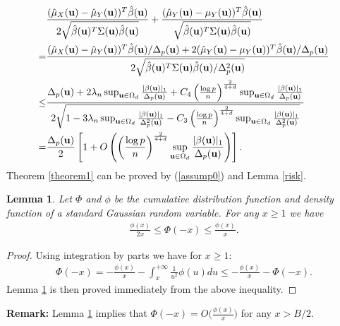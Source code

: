 \documentclass[11pt]{article}
\newtheorem{lem}{Lemma}
\theoremstyle{definition}
\begin{document}
 \begin{align}\label{last1}
 	& \frac{(\hat{\mu}_X({\bf u})-\hat{\mu}_Y({\bf u}))^T\hat{\beta}({\bf u})}{2\sqrt{\hat{\beta}({\bf u})^T\Sigma({\bf u})\hat{\beta}({\bf u})}}+\frac{(\hat{\mu}_Y({\bf u})-\mu_Y({\bf u}))^T\hat{\beta}({\bf u})}{\sqrt{\hat{\beta}({\bf u})^T\Sigma({\bf u})\hat{\beta}({\bf u})}}  \\%
 	=& \frac{(\hat{\mu}_X({\bf u})-\hat{\mu}_Y({\bf u}))^T\hat{\beta}({\bf u})/\Delta_p({\bf u})+
 		2(\hat{\mu}_Y({\bf u})-\mu_Y({\bf u}))^T\hat{\beta}({\bf u})/\Delta_p({\bf u})}{2\sqrt{\hat{\beta}({\bf u})^T\Sigma({\bf u})\hat{\beta}({\bf u})/\Delta^2_p({\bf u})}}   \nonumber\\
 	\leq&  \frac{\Delta_p({\bf u})+2\lambda_n\sup_{{\bf u}\in \Omega_d}\frac{|\beta({\bf u})|_1}{\Delta_p({\bf u})}+C_4\left(\frac{\log p}{n}\right)^{\frac{2}{4+d}} \sup_{{\bf u}\in \Omega_d}\frac{|\beta({\bf u})|_1}{\Delta_p({\bf u})}
 	}{2\sqrt{1-3\lambda_n\sup_{{\bf u}\in \Omega_d}\frac{|\beta({\bf u})|_1}{\Delta^2_p({\bf u})}-C_3\left(\frac{\log p}{n}\right)^{\frac{2}{4+d}} \sup_{{\bf u}\in \Omega_d}\frac{|\beta({\bf u})|_1}{\Delta^2_p({\bf u})}}}  \nonumber \\%
 	=&\frac{\Delta_p({\bf u})}{2}\left[1+O\left( \left(\frac{\log p}{n}\right)^{\frac{2}{4+d}} \sup_{{\bf u}\in \Omega_d}\frac{|\beta({\bf u})|_1}{\Delta_p({\bf u})}\right)\right].  \nonumber
 \end{align}
 Theorem \ref{theorem1} can be proved by (\ref{assump0}) and Lemma \ref{risk}.
 \\
 
 
 
 
 
 \begin{lem}\label{lemma0}
 	Let $\Phi$ and $\phi$ be the cumulative distribution function and density function of a standard Gaussian random variable. For any $x\geq 1$ we have
 	\begin{eqnarray*}
 		\frac{\phi(x)}{2x}\leq \Phi(-x)\leq \frac{\phi(x)}{x}.
 	\end{eqnarray*}
 \end{lem}
 \begin{proof}
 	Using integration by parts we have for $x\geq 1$:
 	\begin{eqnarray*}
 		\Phi(-x)=-\frac{\phi(x)}{x}-\int_{x}^{+\infty}\frac{1}{u^2}\phi(u)du\leq -\frac{\phi(x)}{x}- \Phi(-x).
 	\end{eqnarray*}
 	Lemma \ref{lemma0} is then proved immediately from the above inequality.
 \end{proof}
 {\bf Remark:} Lemma \ref{lemma0} implies that $\Phi(-x)=O\bigg(\frac{\phi(x)}{x}\bigg)$ for any $x>B/2$.
 
\end{document}
